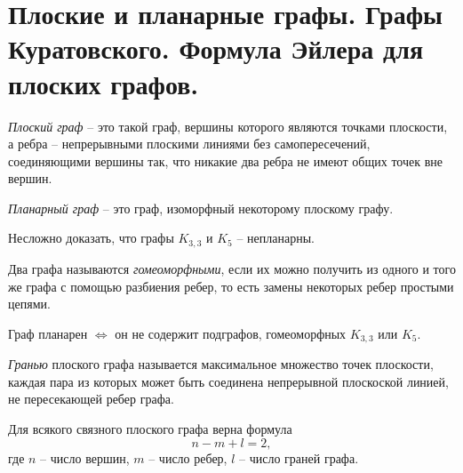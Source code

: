 \newpage

\section{Плоские и планарные графы. Графы Куратовского. Формула Эйлера для плоских графов.}

\begin{definition}
    \emph{Плоский граф} -- это такой граф, вершины которого являются точками плоскости, а ребра -- непрерывными плоскими линиями без самопересечений, соединяющими вершины так, что никакие два ребра не имеют общих точек вне вершин.

    \emph{Планарный граф} -- это граф, изоморфный некоторому плоскому графу.
    \begin{figure}[H]
        \centering
        \label{fig:fig_23}
    \end{figure}
\end{definition}

\begin{remark}
    Несложно доказать, что графы $ K_{3,3} $ и $ K_5 $ -- непланарны.
    \begin{figure}[H]
        \centering
        \label{fig:fig_24}
    \end{figure}
\end{remark}

\begin{definition}
    Два графа называются \emph{гомеоморфными}, если их можно получить из одного и того же графа с помощью разбиения ребер, то есть замены некоторых ребер простыми цепями.
\end{definition}

\begin{theorem}
    Граф планарен $ \iff $ он не содержит подграфов, гомеоморфных $ K_{3,3} $ или $ K_5 $.
\end{theorem}

\begin{definition}[Грань]
    \emph{Гранью} плоского графа называется максимальное множество точек плоскости, каждая пара из которых может быть соединена непрерывной плоскоской линией, не пересекающей ребер графа.
\end{definition}

\newpage

\begin{theorem}
    Для всякого связного плоского графа верна формула
    \begin{equation}\label{eq:2}
        n-m+l=2,
    \end{equation}
    где $ n $ -- число вершин, $ m $ -- число ребер, $ l $ -- число граней графа.
\end{theorem}

